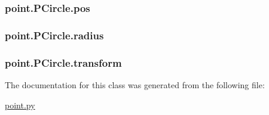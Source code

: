 \subsubsection[{pos}]{\setlength{\rightskip}{0pt plus 5cm}point.\+P\+Circle.\+pos}\label{classpoint_1_1_p_circle_afd3ca22d6db40a41ad58972ad9e51aae}
\hypertarget{classpoint_1_1_p_circle_ae3538c963da5a83e8b24d7fb064ffa5a}{}
\subsubsection[{radius}]{\setlength{\rightskip}{0pt plus 5cm}point.\+P\+Circle.\+radius}\label{classpoint_1_1_p_circle_ae3538c963da5a83e8b24d7fb064ffa5a}
\hypertarget{classpoint_1_1_p_circle_a5659534b267f87d91e369f741830fdf5}{}
\subsubsection[{transform}]{\setlength{\rightskip}{0pt plus 5cm}point.\+P\+Circle.\+transform}\label{classpoint_1_1_p_circle_a5659534b267f87d91e369f741830fdf5}


The documentation for this class was generated from the following file\+:\begin{DoxyCompactItemize}
\item 
\hyperlink{point_8py}{point.\+py}\end{DoxyCompactItemize}
